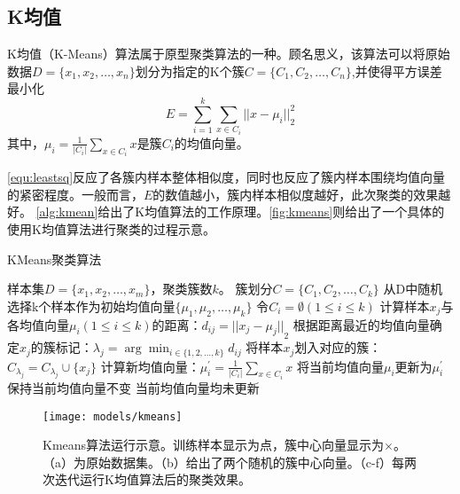 \subsection{K均值}
K均值（K-Means）算法属于原型聚类算法的一种\cite{Zhou2016,Liu2019}。顾名思义，该算法可以将原始数据$D=\{x_1,x_2,\dots,x_n\}$划分为指定的K个簇$C=\{C_1,C_2,\dots,C_n\}$,并使得平方误差最小化
\begin{equation}
    \label{equ:leastsq}
    E=\sum_{i=1}^k \sum_{x \in C_i}{||x- \mu_i||}_2^2
\end{equation}
其中，$\mu_i = \frac{1}{|C_i|} \sum_{x \in C_i}{x}$是簇$C_i$的均值向量。

\autoref{equ:leastsq}反应了各簇内样本整体相似度，同时也反应了簇内样本围绕均值向量的紧密程度。一般而言，$E$的数值越小，簇内样本相似度越好，此次聚类的效果越好。
\autoref{alg:kmean}给出了K均值算法的工作原理。\autoref{fig:kmeans}则给出了一个具体的使用K均值算法进行聚类的过程示意。
\begin{breakablealgorithm}
    \caption[KMeans聚类算法]{KMeans聚类算法\cite{Zhou2016}}
    \label{alg:kmean}
    \begin{algorithmic}[1] %
        \Require 样本集$D=\{x_1,x_2,\dots,x_m\}$，聚类簇数$k$。
        \Ensure 簇划分$C=\{C_1,C_2,\dots,C_k\}$
        \State 从D中随机选择k个样本作为初始均值向量$\{\mu_1,\mu_2,\dots,\mu_k\}$
        \Repeat
        \State 令$C_i=\emptyset (1\le i\le k)$
                \State 计算样本$x_j$与各均值向量$\mu_i (1\le i \le k)$的距离：$d_{ij}={||x_j - \mu_j||}_2$
                \State 根据距离最近的均值向量确定$x_j$的簇标记：$\lambda_j = \arg \min_{i \in \{1,2,\dots,k\}} d_{ij}$
                \State 将样本$x_j$划入对应的簇：$C_{\lambda_j} = C_{\lambda_j} \cup \{x_j\}$
            \EndFor
                \State 计算新均值向量：$\mu_i^{'}=\frac{1}{|C_i|} \sum_{x \in C_i}{x}$
                    \State 将当前均值向量$\mu_i$更新为$\mu_i^{'}$
                \Else
                    \State 保持当前均值向量不变
                \EndIf
            \EndFor
        \Until 当前均值向量均未更新
    \end{algorithmic}
\end{breakablealgorithm}
\begin{figure}[htbp]
    \centering
    \texttt{[image: models/kmeans]}
    \caption[Kmeans算法运行示意]{\label{fig:kmeans}Kmeans算法运行示意\cite{kmeans}。训练样本显示为点，簇中心向量显示为$\times$。（a）为原始数据集。（b）给出了两个随机的簇中心向量。（c-f）每两次迭代运行K均值算法后的聚类效果。}
\end{figure}

